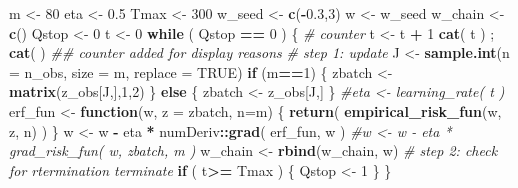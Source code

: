 \documentclass[
]{article}
\newenvironment{Shaded}{\begin{snugshade}}{\end{snugshade}}
\newcommand{\CommentTok}[1]{\textcolor[rgb]{0.56,0.35,0.01}{\textit{#1}}}
\newcommand{\ControlFlowTok}[1]{\textcolor[rgb]{0.13,0.29,0.53}{\textbf{#1}}}
\newcommand{\DataTypeTok}[1]{\textcolor[rgb]{0.13,0.29,0.53}{#1}}
\newcommand{\DecValTok}[1]{\textcolor[rgb]{0.00,0.00,0.81}{#1}}
\newcommand{\FloatTok}[1]{\textcolor[rgb]{0.00,0.00,0.81}{#1}}
\newcommand{\KeywordTok}[1]{\textcolor[rgb]{0.13,0.29,0.53}{\textbf{#1}}}
\newcommand{\NormalTok}[1]{#1}
\newcommand{\OperatorTok}[1]{\textcolor[rgb]{0.81,0.36,0.00}{\textbf{#1}}}
\newcommand{\OtherTok}[1]{\textcolor[rgb]{0.56,0.35,0.01}{#1}}
\newcommand{\StringTok}[1]{\textcolor[rgb]{0.31,0.60,0.02}{#1}}
\begin{document}
\begin{Shaded}
\begin{Highlighting}[]
\NormalTok{m \textless{}{-}}\StringTok{ }\DecValTok{80}
\NormalTok{eta \textless{}{-}}\StringTok{ }\FloatTok{0.5}
\NormalTok{Tmax \textless{}{-}}\StringTok{ }\DecValTok{300}
\NormalTok{w\_seed \textless{}{-}}\StringTok{ }\KeywordTok{c}\NormalTok{(}\OperatorTok{{-}}\FloatTok{0.3}\NormalTok{,}\DecValTok{3}\NormalTok{)}
\NormalTok{w \textless{}{-}}\StringTok{ }\NormalTok{w\_seed}
\NormalTok{w\_chain \textless{}{-}}\StringTok{ }\KeywordTok{c}\NormalTok{()}
\NormalTok{Qstop \textless{}{-}}\StringTok{ }\DecValTok{0} 
\NormalTok{t \textless{}{-}}\StringTok{ }\DecValTok{0}
\ControlFlowTok{while}\NormalTok{ ( Qstop }\OperatorTok{==}\StringTok{ }\DecValTok{0}\NormalTok{ ) \{}
  \CommentTok{\# counter}
\NormalTok{  t \textless{}{-}}\StringTok{ }\NormalTok{t }\OperatorTok{+}\StringTok{  }\DecValTok{1}
  \KeywordTok{cat}\NormalTok{( t ) ; }\KeywordTok{cat}\NormalTok{( }\StringTok{\textquotesingle{} \textquotesingle{}}\NormalTok{ ) }\CommentTok{\#\# counter added for display reasons}
  \CommentTok{\# step 1: update  }
\NormalTok{  J \textless{}{-}}\StringTok{ }\KeywordTok{sample.int}\NormalTok{(}\DataTypeTok{n =}\NormalTok{ n\_obs, }\DataTypeTok{size =}\NormalTok{ m, }\DataTypeTok{replace =} \OtherTok{TRUE}\NormalTok{)}
  \ControlFlowTok{if}\NormalTok{ (m}\OperatorTok{==}\DecValTok{1}\NormalTok{) \{}
\NormalTok{    zbatch \textless{}{-}}\StringTok{ }\KeywordTok{matrix}\NormalTok{(z\_obs[J,],}\DecValTok{1}\NormalTok{,}\DecValTok{2}\NormalTok{)}
\NormalTok{  \}}
  \ControlFlowTok{else}\NormalTok{ \{}
\NormalTok{    zbatch \textless{}{-}}\StringTok{ }\NormalTok{z\_obs[J,]}
\NormalTok{  \}}
  \CommentTok{\#eta \textless{}{-} learning\_rate( t )}
\NormalTok{  erf\_fun \textless{}{-}}\StringTok{ }\ControlFlowTok{function}\NormalTok{(w, }\DataTypeTok{z =}\NormalTok{ zbatch, }\DataTypeTok{n=}\NormalTok{m) \{}
    \KeywordTok{return}\NormalTok{( }\KeywordTok{empirical\_risk\_fun}\NormalTok{(w, z, n) ) }
\NormalTok{  \}}
\NormalTok{  w \textless{}{-}}\StringTok{ }\NormalTok{w }\OperatorTok{{-}}\StringTok{ }\NormalTok{eta }\OperatorTok{*}\StringTok{ }\NormalTok{numDeriv}\OperatorTok{::}\KeywordTok{grad}\NormalTok{( erf\_fun, w )}
  \CommentTok{\#w \textless{}{-} w {-} eta * grad\_risk\_fun( w, zbatch, m )}
\NormalTok{  w\_chain \textless{}{-}}\StringTok{ }\KeywordTok{rbind}\NormalTok{(w\_chain, w)}
  \CommentTok{\# step 2: check for rtermination terminate}
  \ControlFlowTok{if}\NormalTok{ ( t}\OperatorTok{\textgreater{}=}\StringTok{ }\NormalTok{Tmax ) \{}
\NormalTok{    Qstop \textless{}{-}}\StringTok{ }\DecValTok{1}
\NormalTok{  \}}
\NormalTok{\}}
\end{Highlighting}
\end{Shaded}
\end{document}
